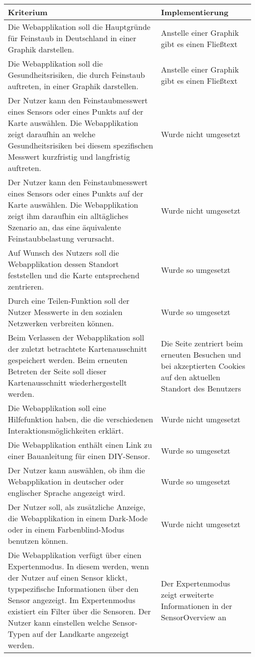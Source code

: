     \begin{tabularx}{\textwidth}{| X | X |}
    \hline
    \textbf{Kriterium} & 
    \textbf{Implementierung}\\
    \hline
    Die Webapplikation soll die Hauptgründe für \gls{Feinstaub} in Deutschland in einer Graphik darstellen. & Anstelle einer Graphik gibt es einen Fließtext \\
    \hline
    Die Webapplikation soll die Gesundheitsrisiken, die durch \gls{Feinstaub} auftreten, in einer Graphik darstellen. & Anstelle einer Graphik gibt es einen Fließtext \\
    \hline
    Der Nutzer kann den \gls{Feinstaub}messwert eines Sensors oder eines Punkts auf der Karte auswählen. 
    Die Webapplikation zeigt daraufhin an welche Gesundheitsrisiken bei diesem spezifischen Messwert kurzfristig und langfristig auftreten. & Wurde nicht umgesetzt \\
    \hline
    Der Nutzer kann den \gls{Feinstaub}messwert eines Sensors oder eines Punkts auf der Karte auswählen. 
    Die Webapplikation zeigt ihm daraufhin ein alltägliches Szenario an, das eine äquivalente \gls{Feinstaub}belastung verursacht. & Wurde nicht umgesetzt \\
    \hline
    Auf Wunsch des Nutzers soll die Webapplikation dessen Standort feststellen und die Karte entsprechend zentrieren. & Wurde so umgesetzt \\
    \hline
    Durch eine Teilen-Funktion soll der Nutzer Messwerte in den sozialen Netzwerken verbreiten können. & Wurde so umgesetzt \\
    \hline
    Beim Verlassen der Webapplikation soll der zuletzt betrachtete Kartenausschnitt gespeichert werden. Beim erneuten Betreten der Seite soll dieser Kartenausschnitt wiederhergestellt werden. & Die Seite zentriert beim erneuten Besuchen und bei akzeptierten Cookies auf den aktuellen Standort des Benutzers \\
    \hline
    Die Webapplikation soll eine Hilfefunktion haben, die die verschiedenen Interaktionsmöglichkeiten erklärt. & Wurde nicht umgesetzt \\
    \hline
    Die Webapplikation enthält einen Link zu einer Bauanleitung für einen \gls{DIY}-Sensor. & Wurde so umgesetzt \\
    \hline
    Der Nutzer kann auswählen, ob ihm die Webapplikation in deutscher oder englischer Sprache angezeigt wird. & Wurde so umgesetzt \\
    \hline
    Der Nutzer soll, als zusätzliche Anzeige, die Webapplikation in einem Dark-Mode oder in einem Farbenblind-Modus benutzen können. & Wurde nicht umgesetzt \\
    \hline
    Die Webapplikation verfügt über einen Expertenmodus. In diesem werden, wenn der Nutzer auf einen Sensor klickt, typspezifische Informationen über den Sensor angezeigt.
    Im Expertenmodus existiert ein Filter über die Sensoren. Der Nutzer kann einstellen welche Sensor-Typen auf der Landkarte angezeigt werden. & Der Expertenmodus zeigt erweiterte Informationen in der SensorOverview an\\
    \hline
    \end{tabularx}
